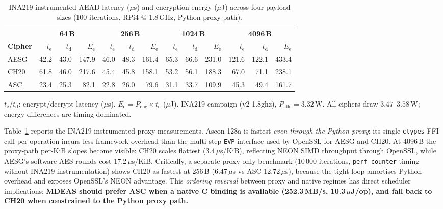 \begin{table}[t]
\centering
\caption{INA219-instrumented AEAD latency ($\mu$s) and encryption
  energy ($\mu$J) across four payload sizes
  (100 iterations, RPi4 @ 1.8\,GHz, Python proxy path).}
\label{tab:aead_ina}
\footnotesize
\setlength{\tabcolsep}{3pt}
\begin{tabular}{@{}l|rrr|rrr|rrr|rrr@{}}
\toprule
 & \multicolumn{3}{c|}{\textbf{64\,B}}
 & \multicolumn{3}{c|}{\textbf{256\,B}}
 & \multicolumn{3}{c|}{\textbf{1024\,B}}
 & \multicolumn{3}{c}{\textbf{4096\,B}} \\
\cmidrule(lr){2-4}\cmidrule(lr){5-7}
\cmidrule(lr){8-10}\cmidrule(lr){11-13}
\textbf{Cipher}
  & $t_\text{e}$ & $t_\text{d}$ & $E_\text{e}$
  & $t_\text{e}$ & $t_\text{d}$ & $E_\text{e}$
  & $t_\text{e}$ & $t_\text{d}$ & $E_\text{e}$
  & $t_\text{e}$ & $t_\text{d}$ & $E_\text{e}$ \\
\midrule
AESG & 42.2 & 43.0 & 147.9
     & 46.0 & 48.3 & 161.4
     & 65.3 & 66.6 & 231.0
     & 121.6 & 122.1 & 433.4 \\
CH20 & 61.8 & 46.0 & 217.6
     & 45.4 & 45.8 & 158.1
     & 53.2 & 56.1 & 188.3
     & 67.0 & 71.1 & 238.1 \\
ASC  & 23.4 & 25.3 & 82.1
     & 22.8 & 26.0 & 79.6
     & 31.1 & 33.7 & 109.9
     & 45.3 & 49.4 & 161.7 \\
\bottomrule
\end{tabular}
\begin{tablenotes}
\item $t_\text{e}$/$t_\text{d}$: encrypt/decrypt latency ($\mu$s).
  $E_\text{e} = P_\text{enc} \times t_\text{e}$ ($\mu$J).
  INA219 campaign (v2-1.8ghz), $P_\text{idle} = 3.32$\,W.
  All ciphers draw $3.47$--$3.58$\,W; energy differences are
  timing-dominated.
\end{tablenotes}
\end{table}

Table~\ref{tab:aead_ina} reports the INA219-instrumented proxy
measurements.
Ascon-128a is fastest \emph{even through the Python proxy}: its
single \texttt{ctypes} FFI call per operation incurs less framework
overhead than the multi-step \texttt{EVP} interface used by
OpenSSL for AESG and CH20.
At 4096\,B the proxy-path per-KiB slopes become visible:
CH20 scales flattest (3.4\,$\mu$s/KiB), reflecting NEON SIMD
throughput through OpenSSL, while AESG's software AES rounds cost
17.2\,$\mu$s/KiB.
Critically, a separate proxy-only benchmark (10\,000 iterations,
\texttt{perf\_counter} timing without INA219 instrumentation) shows
CH20 as fastest at 256\,B (6.47\,$\mu$s vs ASC 12.72\,$\mu$s),
because the tight-loop amortises Python overhead and exposes
OpenSSL's NEON advantage.
This \emph{ordering reversal} between proxy and native regimes has
direct scheduler implications:
\textbf{MDEAS should prefer ASC when a native C binding is available
(252.3\,MB/s, 10.3\,$\mu$J/op), and fall back to CH20 when
constrained to the Python proxy path.}

